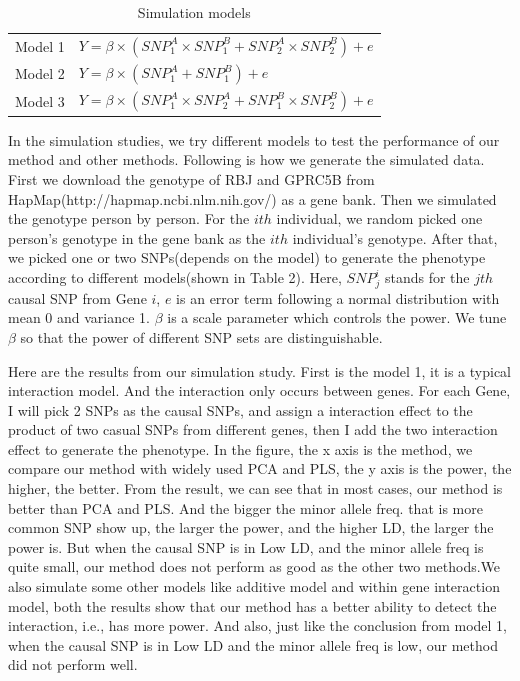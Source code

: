 \documentclass{article}
\begin{document}
        \begin{table}[htbp]
            \centering
            \caption{Simulation models}
            \begin{tabular}{c|l}
                \toprule
                Model 1 & $Y =\beta\times (SNP^A_1\times SNP^B_1+SNP^A_2\times SNP^B_2)+e$  \\
                Model 2 & $Y =\beta\times (SNP^A_1+SNP^B_1)+e$\\
                Model 3 & $Y =\beta\times (SNP^A_1\times SNP^A_2+SNP^B_1\times SNP^B_2)+e$\\
                \bottomrule
            \end{tabular}
        \end{table}

        In the simulation studies, we try different models to test the performance of our method and other methods. Following is how we generate the simulated data. First we download the genotype of RBJ and GPRC5B from HapMap(http://hapmap.ncbi.nlm.nih.gov/) as a gene bank. Then we simulated the genotype person by person. For the $ith$ individual, we random picked one person's genotype in the gene bank as the $ith$ individual's genotype. After that, we picked one or two SNPs(depends on the model) to generate the phenotype according to different models(shown in Table 2). Here, $SNP^i_j$ stands for the $jth$ causal SNP from Gene $i$, $e$ is an error term following a normal distribution with mean 0 and variance 1. $\beta$ is a scale parameter which controls the power. We tune $\beta$ so that the power of different SNP sets are distinguishable.

        Here are the results from our simulation study. First is the model 1, it is a typical interaction model. And the interaction only occurs between genes. For each Gene, I will pick 2 SNPs as the causal SNPs, and assign a interaction effect to the product of two casual SNPs from different genes, then I add the two interaction effect to generate the phenotype. In the figure, the x axis is the method, we compare our method with widely used PCA and PLS, the y axis is the power, the higher, the better. From the result, we can see that in most cases, our method is better than PCA and PLS. And the bigger the minor allele freq. that is more common SNP show up, the larger the power, and the higher LD, the larger the power is. But when the causal SNP is in Low LD, and the minor allele freq is quite small, our method does not perform as good as the other two methods.We also simulate some other models like additive model and within gene interaction model, both the results show that our method has a better ability to detect the interaction, i.e., has more power. And also, just like the conclusion from model 1, when the causal SNP is in Low LD and the minor allele freq is low, our method did not perform well.
\end{document}

